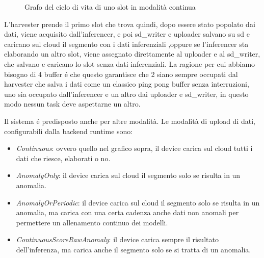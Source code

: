 \begin{figure}[H]
	\caption{Grafo del ciclo di vita di uno slot in modalità continua}
	\label{fig:slot_lifecycle_fork_join_spaced}
\end{figure}


L'harvester prende il primo slot che trova quindi, dopo essere stato popolato dai dati, viene acquisito dall'inferencer, e poi sd\_writer e uploader salvano su sd e caricano sul cloud il segmento con i dati inferenziali ,oppure se l'inferencer sta elaborando un altro slot, viene assegnato direttamente al uploader e al sd\_writer, che salvano e caricano lo slot senza dati inferenziali.
La ragione per cui abbiamo bisogno di 4 buffer é che questo garantisce che 2 siano sempre occupati dal harvester che salva i dati come un classico ping pong buffer senza interruzioni, uno sia occupato dall'inferencer e un altro dai uploader e sd\_writer, in questo modo nessun task deve aspettarne un altro.

Il sistema é predisposto anche per altre modalità. Le modalità di upload di dati, configurabili dalla backend runtime sono:

\begin{itemize}
	\item \textit{Continuous}: ovvero quello nel grafico sopra, il device carica sul cloud tutti i dati che riesce, elaborati o no.
	\item \textit{AnomalyOnly}: il device carica sul cloud il segmento solo se risulta in un anomalia.
	\item \textit{AnomalyOrPeriodic}: il device carica sul cloud il segmento solo se risulta in un anomalia, ma carica con una certa cadenza anche dati non anomali per permettere un allenamento continuo dei modelli.
	\item \textit{ContinuousScoreRawAnomaly}: il device carica sempre il risultato dell'inferenza, ma carica anche il segmento solo se si tratta di un anomalia.
\end{itemize}


